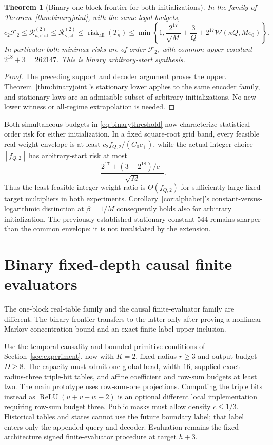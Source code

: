\documentclass[11pt,letterpaper]{article}
\newtheorem{theorem}{Theorem}[section]
\theoremstyle{definition}\newtheorem{definition}[theorem]{Definition}
\theoremstyle{remark}\newtheorem{remark}[theorem]{Remark}
\newcommand{\ceil}[1]{\left\lceil #1\right\rceil}
\newcommand{\Risk}{\mathcal{R}}
\begin{document}
\begin{theorem}[Binary one-block frontier for both initializations]\label{thm:binaryall}
In the family of Theorem~\ref{thm:binaryjoint}, with the same legal budgets,
\begin{equation}\label{eq:binaryall}
 c_2\mathcal F_2\le
 \Risk_{\kappa,\mathrm{stat}}^{(2)}
 \le\Risk_{\kappa,\mathrm{all}}^{(2)}
 \le\operatorname{risk}_{\mathrm{all}}(T_\kappa)
 \le\min\left\{1,\frac{2^{17}}{\sqrt M}+\frac3Q+
 2^{17}\mathcal W(\kappa Q,Me_0)\right\}.
\end{equation}
In particular both minimax risks are of order $\mathcal F_2$, with common upper constant $2^{18}+3=262147$. This is binary arbitrary-start synthesis.
\end{theorem}
\begin{proof}
The preceding support and decoder argument proves the upper. Theorem~\ref{thm:binaryjoint}'s stationary lower applies to the same encoder family, and stationary laws are an admissible subset of arbitrary initializations. No new lower witness or all-regime extrapolation is needed.
\end{proof}

Both simultaneous budgets in \eqref{eq:binarythreshold} now characterize statistical-order risk for either initialization. In a fixed square-root grid band, every feasible real weight envelope is at least
$c_2f_{Q,2}/(C_0c_+)$, while the actual integer choice
$\ceil{f_{Q,2}}$ has arbitrary-start risk at most
\[
 \frac{2^{17}+(3+2^{18})/c_-}{\sqrt M}.
\]
Thus the least feasible integer weight ratio is $\Theta(f_{Q,2})$ for sufficiently large fixed target multipliers in both experiments. Corollary~\ref{cor:alphabet}'s constant-versus-logarithmic distinction at $\beta=1/M$ consequently holds also for arbitrary initialization. The previously established stationary constant $544$ remains sharper than the common envelope; it is not invalidated by the extension.

\section{Binary fixed-depth causal finite evaluators}\label{sec:binarycausal}
The one-block real-table family and the causal finite-evaluator family are different. The binary frontier transfers to the latter only after proving a nonlinear Markov concentration bound and an exact finite-label upper inclusion.

Use the temporal-causality and bounded-primitive conditions of Section~\ref{sec:experiment}, now with $K=2$, fixed radius $r\ge3$ and output budget $D\ge8$. The capacity must admit one global head, width $16$, supplied exact radius-three triple-bit tables, and affine coefficient and row-sum budgets at least two. The main prototype uses row-sum-one projections. Computing the triple bits instead as $\operatorname{ReLU}(u+v+w-2)$ is an optional different local implementation requiring row-sum budget three. Public masks must allow density $c\le1/3$. Historical tables and states cannot use the future boundary label; that label enters only the appended query and decoder. Evaluation remains the fixed-architecture signed finite-evaluator procedure at target $h+3$.
\end{document}
